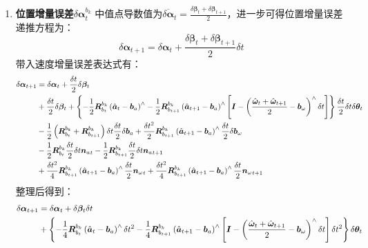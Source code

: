 \begin{enumerate}
	\item \textbf{位置增量误差}$\delta\bm{\alpha}_t^{b_k}$
	中值点导数值为$\overline{\delta\bm{\alpha}}_t=\frac{\delta\bm{\beta}_t+\delta\bm{\beta}_{t+1}}{2}$，进一步可得位置增量误差递推方程为：
	\begin{equation}
	\delta\bm{\alpha}_{t+1}=\delta\bm{\alpha}_t+\frac{\delta\bm{\beta}_t+\delta\bm{\beta}_{t+1}}{2}\delta t
	\end{equation}
	带入速度增量误差表达式有：
	\begin{equation}
	\centering
	\begin{aligned}
	\delta\bm{\alpha}_{t+1}&=\delta\bm{\alpha}_t+\frac{\delta t}{2}\delta\bm{\beta}_t\\
	&+\frac{\delta t}{2}\delta\bm{\beta}_t+\left\{-\frac{1}{2}\bm{R}_{b_t}^{b_k}\left(\hat{\bm{a}}_t-\bm{b}_a\right)^\wedge-\frac{1}{2}\bm{R}_{b_{t+1}}^{b_k}\left(\hat{\bm{a}}_{t+1}-\bm{b}_a\right)^\wedge\left[\bm{I}-\left(\frac{\hat{\bm{\omega}}_t+\hat{\bm{\omega}}_{t+1}}{2}-\bm{b}_\omega\right)^\wedge\delta t\right]\right\}\frac{\delta t}{2}\delta t\delta\bm{\theta}_t\\
	&-\frac{1}{2}\left(\bm{R}_{b_t}^{b_k}+\bm{R}_{b_{t+1}}^{b_k}\right)\delta t\frac{\delta t}{2}\delta\bm{b}_a+\frac{\delta t^2}{2}\bm{R}_{b_{t+1}}^{b_k}\left(\hat{\bm{a}}_{t+1}-\bm{b}_a\right)^\wedge\frac{\delta t}{2}\delta\bm{b}_\omega\\
	&-\frac{1}{2}\bm{R}_{b_t}^{b_k}\frac{\delta t}{2}\delta t{\bm{n}_a}_t-\frac{1}{2}\bm{R}_{b_{t+1}}^{b_k}\frac{\delta t}{2}\delta t{\bm{n}_a}_{t+1}\\
	&+\frac{\delta t^2}{4}\bm{R}_{b_{t+1}}^{b_k}\left(\hat{\bm{a}}_{t+1}-\bm{b}_a\right)^\wedge\frac{\delta t}{2}{\bm{n}_\omega}_t+\frac{\delta t^2}{4}\bm{R}_{b_{t+1}}^{b_k}\left(\hat{\bm{a}}_{t+1}-\bm{b}_a\right)^\wedge\frac{\delta t}{2}{\bm{n}_\omega}_{t+1}\\
	\end{aligned}
	\end{equation}
	整理后得到：
	\begin{equation}
	\centering
	\begin{aligned}
	\delta\bm{\alpha}_{t+1}&=\delta\bm{\alpha}_t+\delta\bm{\beta}_t\delta t\\
	&+\left\{-\frac{1}{4}\bm{R}_{b_t}^{b_k}\left(\hat{\bm{a}}_t-\bm{b}_a\right)^\wedge\delta t^2-\frac{1}{4}\bm{R}_{b_{t+1}}^{b_k}\left(\hat{\bm{a}}_{t+1}-\bm{b}_a\right)^\wedge\left[\bm{I}-\left(\frac{\hat{\bm{\omega}}_t+\hat{\bm{\omega}}_{t+1}}{2}-\bm{b}_\omega\right)^\wedge\delta t\right]\delta t^2\right\}\delta\bm{\theta}_t\\

\end{aligned}
\end{equation}
\end{enumerate}
